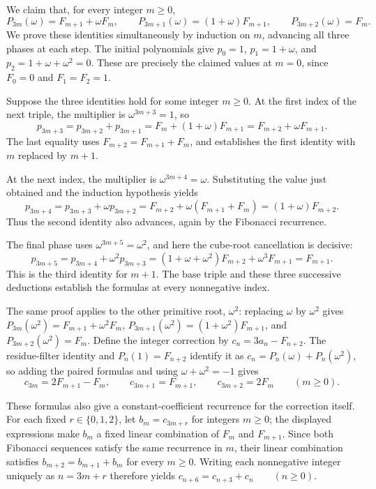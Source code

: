 \documentclass[11pt]{article}
\begin{document}
We claim that, for every integer $m\geq 0$,
\[P_{3m}(\omega)=F_{m+1}+\omega F_m,\qquad P_{3m+1}(\omega)=(1+\omega)F_{m+1},\qquad P_{3m+2}(\omega)=F_m.\]
We prove these identities simultaneously by induction on $m$, advancing all three phases at each step. The initial polynomials give $p_0=1$, $p_1=1+\omega$, and $p_2=1+\omega+\omega^2=0$. These are precisely the claimed values at $m=0$, since $F_0=0$ and $F_1=F_2=1$.

Suppose the three identities hold for some integer $m\geq 0$. At the first index of the next triple, the multiplier is $\omega^{3m+3}=1$, so
\[p_{3m+3}=p_{3m+2}+p_{3m+1}=F_m+(1+\omega)F_{m+1}=F_{m+2}+\omega F_{m+1}.\]
The last equality uses $F_{m+2}=F_{m+1}+F_m$, and establishes the first identity with $m$ replaced by $m+1$.

At the next index, the multiplier is $\omega^{3m+4}=\omega$. Substituting the value just obtained and the induction hypothesis yields
\[p_{3m+4}=p_{3m+3}+\omega p_{3m+2}=F_{m+2}+\omega(F_{m+1}+F_m)=(1+\omega)F_{m+2}.\]
Thus the second identity also advances, again by the Fibonacci recurrence.

The final phase uses $\omega^{3m+5}=\omega^2$, and here the cube-root cancellation is decisive:
\[p_{3m+5}=p_{3m+4}+\omega^2p_{3m+3}=(1+\omega+\omega^2)F_{m+2}+\omega^3F_{m+1}=F_{m+1}.\]
This is the third identity for $m+1$. The base triple and these three successive deductions establish the formulas at every nonnegative index.

The same proof applies to the other primitive root, $\omega^2$: replacing $\omega$ by $\omega^2$ gives $P_{3m}(\omega^2)=F_{m+1}+\omega^2F_m$, $P_{3m+1}(\omega^2)=(1+\omega^2)F_{m+1}$, and $P_{3m+2}(\omega^2)=F_m$. Define the integer correction by $c_n=3a_n-F_{n+2}$. The residue-filter identity and $P_n(1)=F_{n+2}$ identify it as $c_n=P_n(\omega)+P_n(\omega^2)$, so adding the paired formulas and using $\omega+\omega^2=-1$ gives
\[c_{3m}=2F_{m+1}-F_m,\qquad c_{3m+1}=F_{m+1},\qquad c_{3m+2}=2F_m\qquad(m\geq 0).\]

These formulas also give a constant-coefficient recurrence for the correction itself. For each fixed $r\in\{0,1,2\}$, let $b_m=c_{3m+r}$ for integers $m\geq 0$; the displayed expressions make $b_m$ a fixed linear combination of $F_m$ and $F_{m+1}$. Since both Fibonacci sequences satisfy the same recurrence in $m$, their linear combination satisfies $b_{m+2}=b_{m+1}+b_m$ for every $m\geq 0$. Writing each nonnegative integer uniquely as $n=3m+r$ therefore yields
$c_{n+6}=c_{n+3}+c_n\qquad(n\geq 0).$
\end{document}
